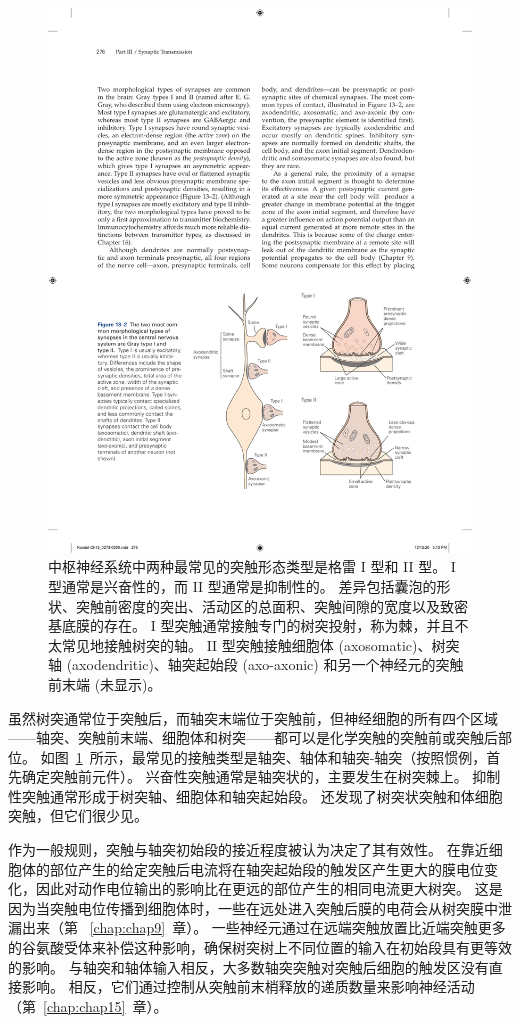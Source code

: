 \begin{figure}[htbp]
	\centering
	\includegraphics[width=0.7\linewidth]{chap13/fig_13_2}
	\caption{中枢神经系统中两种最常见的突触形态类型是格雷 I 型和 II 型。 I 型通常是兴奋性的，而 II 型通常是抑制性的。 差异包括囊泡的形状、突触前密度的突出、活动区的总面积、突触间隙的宽度以及致密基底膜的存在。 I 型突触通常接触专门的树突投射，称为棘，并且不太常见地接触树突的轴。 II 型突触接触细胞体 (axosomatic)、树突轴 (axodendritic)、轴突起始段 (axo-axonic) 和另一个神经元的突触前末端 (未显示)。}
	\label{fig:13_2}
\end{figure}


虽然树突通常位于突触后，而轴突末端位于突触前，但神经细胞的所有四个区域——轴突、突触前末端、细胞体和树突——都可以是化学突触的突触前或突触后部位。
如图~\ref{fig:13_2}~所示，最常见的接触类型是轴突、轴体和轴突-轴突（按照惯例，首先确定突触前元件）。
兴奋性突触通常是轴突状的，主要发生在树突棘上。
抑制性突触通常形成于树突轴、细胞体和轴突起始段。
还发现了树突状突触和体细胞突触，但它们很少见。


作为一般规则，突触与轴突初始段的接近程度被认为决定了其有效性。
在靠近细胞体的部位产生的给定突触后电流将在轴突起始段的触发区产生更大的膜电位变化，因此对动作电位输出的影响比在更远的部位产生的相同电流更大树突。
这是因为当突触电位传播到细胞体时，一些在远处进入突触后膜的电荷会从树突膜中泄漏出来（第 ~\ref{chap:chap9}~章）。
一些神经元通过在远端突触放置比近端突触更多的谷氨酸受体来补偿这种影响，确保树突树上不同位置的输入在初始段具有更等效的影响。
与轴突和轴体输入相反，大多数轴突突触对突触后细胞的触发区没有直接影响。
相反，它们通过控制从突触前末梢释放的递质数量来影响神经活动（第~\ref{chap:chap15}~章）。



